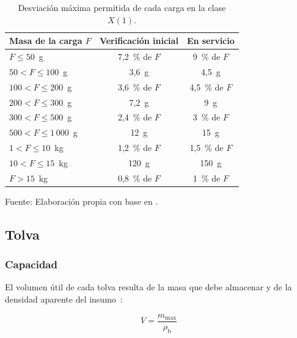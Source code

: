\begin{table}[H]
    \centering
    \caption{Desviación máxima permitida de cada carga en la clase $X(1)$.}
    \label{tab:mpd_r61}
    \footnotesize
    \renewcommand{\arraystretch}{1.2}

    \begin{tabular}{lcc}
        \toprule[1pt]
        \textbf{Masa de la carga $F$} & \textbf{Verificación inicial} &
        \textbf{En servicio} \\
        \midrule[1pt]
        $F \le 50$~g & 7,2~\% de $F$ & 9~\% de $F$ \\
        $50 < F \le 100$~g & 3,6~g & 4,5~g \\
        $100 < F \le 200$~g & 3,6~\% de $F$ & 4,5~\% de $F$ \\
        $200 < F \le 300$~g & 7,2~g & 9~g \\
        $300 < F \le 500$~g & 2,4~\% de $F$ & 3~\% de $F$ \\
        $500 < F \le 1\,000$~g & 12~g & 15~g \\
        $1 < F \le 10$~kg & 1,2~\% de $F$ & 1,5~\% de $F$ \\
        $10 < F \le 15$~kg & 120~g & 150~g \\
        $F > 15$~kg & 0,8~\% de $F$ & 1~\% de $F$ \\
        \bottomrule[1pt]
    \end{tabular}

    \vspace{2pt}
    {\footnotesize Fuente: Elaboración propia con base en \textcite{oiml2017r61}.}
\end{table}

\subsection{Tolva}
\label{subsec:fund_tolva}

\subsubsection{Capacidad}
\label{subsubsec:fund_capacidad}

El volumen útil de cada tolva resulta de la masa que debe almacenar y de la
densidad aparente del insumo~\parencite{orozco2024dosificadora}:

\begin{equation}
    V = \frac{m_{\max}}{\rho_{\mathrm{b}}}
    \label{eq:capacidad_tolva}
\end{equation}

